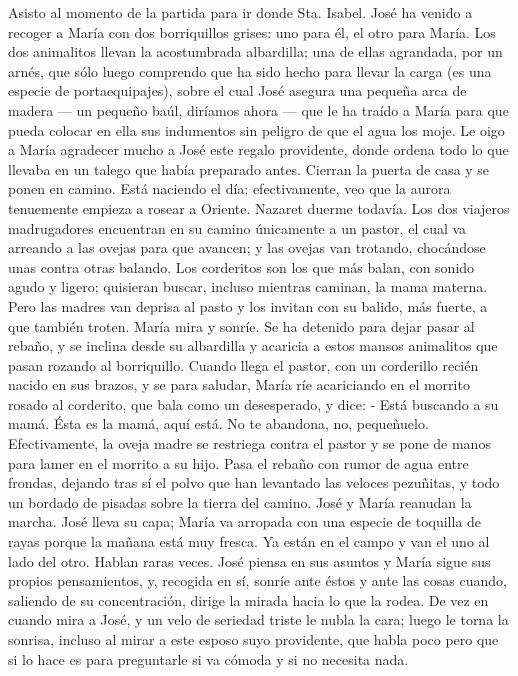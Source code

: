 \documentclass[12pt]{book} %
\begin{document}
Asisto al momento de la partida para ir donde Sta. Isabel. José ha venido a recoger a María con dos borriquillos grises: 
uno para él, el otro para María. Los dos animalitos llevan la acostumbrada albardilla; una de ellas agrandada, por un arnés, que sólo luego comprendo que ha sido hecho para llevar la carga (es una especie de portaequipajes), sobre el cual José asegura una pequeña arca de madera — un pequeño baúl, diríamos ahora — que le ha traído a María para que pueda colocar en ella sus indumentos sin peligro de que el agua los moje. 
Le oigo a María agradecer mucho a José este regalo providente, donde ordena todo lo que llevaba en un talego que había preparado antes.    
Cierran la puerta de casa y se ponen en camino. Está naciendo el día; efectivamente, veo que la aurora tenuemente empieza a rosear a Oriente. Nazaret duerme todavía. Los dos viajeros madrugadores encuentran en su camino únicamente a un pastor, el cual va arreando a las ovejas para que avancen; y las ovejas van trotando, chocándose unas contra otras balando. Los corderitos son los que más balan, con sonido agudo y ligero; quisieran buscar, incluso mientras caminan, la mama materna. Pero las madres van deprisa al pasto y los invitan con su balido, más fuerte, a que también troten. 
María mira y sonríe. Se ha detenido para dejar pasar al rebaño, y se inclina desde su albardilla y acaricia a estos mansos 
animalitos que pasan rozando al borriquillo. Cuando llega el pastor, con un corderillo recién nacido en sus brazos, y se para saludar, María ríe acariciando en el morrito rosado al corderito, que bala como un desesperado, y dice: 
- Está buscando a su mamá. Ésta es la mamá, aquí está. No te abandona, no, pequeñuelo. Efectivamente, la oveja 
madre se restriega contra el pastor y se pone de manos para lamer en el morrito a su hijo. 
Pasa el rebaño con rumor de agua entre frondas, dejando tras sí el polvo que han levantado las veloces pezuñitas, y 
todo un bordado de pisadas sobre la tierra del camino. 
José y María reanudan la marcha. José lleva su capa; María va arropada con una especie de toquilla de rayas porque la mañana está muy fresca. 
Ya están en el campo y van el uno al lado del otro. Hablan raras veces. José piensa en sus asuntos y María sigue sus 
propios pensamientos, y, recogida en sí, sonríe ante éstos y ante las cosas cuando, saliendo de su concentración, dirige la mirada hacia lo que la rodea. De vez en cuando mira a José, y un velo de seriedad triste le nubla la cara; luego le torna la sonrisa, incluso al mirar a este esposo suyo  providente, que habla poco pero que si lo hace es para preguntarle si va cómoda y si no necesita nada. 
\end{document}
